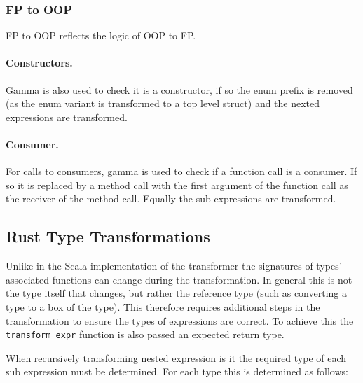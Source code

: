 \documentclass[ oneside,%
                    author={James Elgar},
                    degree={MEng},
                     title={Bidirectional transformer between functional and \\ object-oriented programming in Rust},
                  subtitle={}]{dissertation}
\begin{document}
\subsubsection{FP to OOP}

FP to OOP reflects the logic of OOP to FP.

\paragraph{Constructors. }  Gamma is also used to check it is a constructor, if so the enum prefix is removed (as the enum variant is transformed to a top level struct) and the nexted expressions are transformed.

\paragraph{Consumer. } For calls to consumers, gamma is used to check if a function call is a consumer. If so it is replaced by a method call with the first argument of the function call as the receiver of the method call. Equally the sub expressions are transformed.

\subsection{Rust Type Transformations}


Unlike in the Scala implementation of the transformer the signatures of types' associated functions can change during the transformation. In general this is not the type itself that changes, but rather the reference type (such as converting a type to a box of the type). This therefore requires additional steps in the transformation to ensure the types of expressions are correct. To achieve this the \verb|transform_expr| function is also passed an expected return type.

When recursively transforming nested expression is it the required type of each sub expression must be determined. For each type this is determined as follows:
\end{document}
